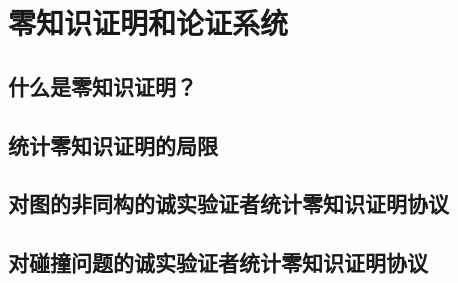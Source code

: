 \chapter{零知识证明和论证系统}\label{chp:11ZKP}

\section{什么是零知识证明？}\label{11.1}
\section{统计零知识证明的局限}\label{11.2}
\section{对图的非同构的诚实验证者统计零知识证明协议}\label{11.3}
\section{对碰撞问题的诚实验证者统计零知识证明协议}\label{11.4}